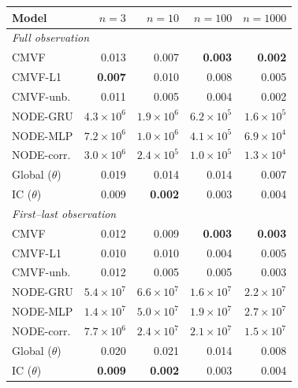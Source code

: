 \begin{tabular}{lrrrr}
\toprule
Model & $n{=}3$ & $n{=}10$ & $n{=}100$ & $n{=}1000$ \\
\midrule
\multicolumn{5}{l}{\emph{Full observation}} \\
CMVF & 0.013 & 0.007 & \textbf{0.003} & \textbf{0.002} \\
CMVF-L1 & \textbf{0.007} & 0.010 & 0.008 & 0.005 \\
CMVF-unb. & 0.011 & 0.005 & 0.004 & 0.002 \\
NODE-GRU & $4.3\!\times\!10^{6}$ & $1.9\!\times\!10^{6}$ & $6.2\!\times\!10^{5}$ & $1.6\!\times\!10^{5}$ \\
NODE-MLP & $7.2\!\times\!10^{6}$ & $1.0\!\times\!10^{6}$ & $4.1\!\times\!10^{5}$ & $6.9\!\times\!10^{4}$ \\
NODE-corr. & $3.0\!\times\!10^{6}$ & $2.4\!\times\!10^{5}$ & $1.0\!\times\!10^{5}$ & $1.3\!\times\!10^{4}$ \\
Global ($\theta$) & 0.019 & 0.014 & 0.014 & 0.007 \\
IC ($\theta$) & 0.009 & \textbf{0.002} & 0.003 & 0.004 \\
\midrule
\multicolumn{5}{l}{\emph{First--last observation}} \\
CMVF & 0.012 & 0.009 & \textbf{0.003} & \textbf{0.003} \\
CMVF-L1 & 0.010 & 0.010 & 0.004 & 0.005 \\
CMVF-unb. & 0.012 & 0.005 & 0.005 & 0.003 \\
NODE-GRU & $5.4\!\times\!10^{7}$ & $6.6\!\times\!10^{7}$ & $1.6\!\times\!10^{7}$ & $2.2\!\times\!10^{7}$ \\
NODE-MLP & $1.4\!\times\!10^{7}$ & $5.0\!\times\!10^{7}$ & $1.9\!\times\!10^{7}$ & $2.7\!\times\!10^{7}$ \\
NODE-corr. & $7.7\!\times\!10^{6}$ & $2.4\!\times\!10^{7}$ & $2.1\!\times\!10^{7}$ & $1.5\!\times\!10^{7}$ \\
Global ($\theta$) & 0.020 & 0.021 & 0.014 & 0.008 \\
IC ($\theta$) & \textbf{0.009} & \textbf{0.002} & 0.003 & 0.004 \\
\bottomrule
\end{tabular}
